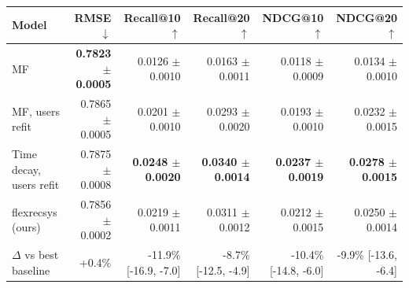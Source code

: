 \begin{tabular}{lrrrrr}
\toprule
Model & RMSE $\downarrow$ & Recall@10 $\uparrow$ & Recall@20 $\uparrow$ & NDCG@10 $\uparrow$ & NDCG@20 $\uparrow$ \\
\midrule
MF & \textbf{0.7823 $\pm$ 0.0005} & 0.0126 $\pm$ 0.0010 & 0.0163 $\pm$ 0.0011 & 0.0118 $\pm$ 0.0009 & 0.0134 $\pm$ 0.0010 \\
MF, users refit & 0.7865 $\pm$ 0.0005 & 0.0201 $\pm$ 0.0010 & 0.0293 $\pm$ 0.0020 & 0.0193 $\pm$ 0.0010 & 0.0232 $\pm$ 0.0015 \\
Time decay, users refit & 0.7875 $\pm$ 0.0008 & \textbf{0.0248 $\pm$ 0.0020} & \textbf{0.0340 $\pm$ 0.0014} & \textbf{0.0237 $\pm$ 0.0019} & \textbf{0.0278 $\pm$ 0.0015} \\
flexrecsys (ours) & 0.7856 $\pm$ 0.0002 & 0.0219 $\pm$ 0.0011 & 0.0311 $\pm$ 0.0012 & 0.0212 $\pm$ 0.0015 & 0.0250 $\pm$ 0.0014 \\
\midrule
$\Delta$ vs best baseline & +0.4\% & -11.9\% [-16.9, -7.0] & -8.7\% [-12.5, -4.9] & -10.4\% [-14.8, -6.0] & -9.9\% [-13.6, -6.4] \\
\bottomrule
\end{tabular}
